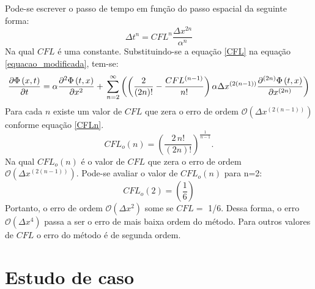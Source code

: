 \documentclass[10pt,twoside,a4paper]{article}
\begin{document}
Pode-se escrever o passo de tempo em função do passo espacial da seguinte forma:
\begin{equation} 
\Delta t^n= CFL^n \frac{\Delta x^{2n}}{\alpha^{n}}
\end{equation}
Na qual $CFL$ é uma constante. Substituindo-se a equação \ref{CFL} na equação \ref{equacao_modificada}, tem-se:
\begin{equation} \label{equacao_modificadaCFL}
\frac{\partial \Phi \left( x,t \right)}{\partial t} = \alpha \frac{\partial^{2} \Phi \left(t, x\right)}{\partial x^{2}}+ \\
\sum\limits_{n=2}^{\infty}\left( \left(\frac{ 2  }{\left(2n\right)!} -\frac{CFL^{\left(n-1\right)}  }{n!}\right) \alpha \Delta x^{\left(2\left(n-1\right)\right)} \frac{\partial^{\left(2n\right)} \Phi \left(t, x\right)}{\partial x^{\left(2n\right)}}\right)
\end{equation}
Para cada $n$ existe um valor de $CFL$ que zera o erro de ordem  $\mathcal{O}\left(\Delta x^{\left(2\left(n-1\right)\right)}\right)$ conforme equação \ref{CFLn}.
\begin{equation} \label{CFLn}
CFL_o\left(n\right)=\left(\frac{2 \, n!}{(2n)!}\right)^\frac{1}{n-1}.
\end{equation}
Na qual $CFL_o\left(n\right)$ é o valor de $CFL$ que zera o erro de ordem  $\mathcal{O}\left(\Delta x^{\left(2\left(n-1\right)\right)}\right)$. Pode-se avaliar o valor de $CFL_o\left(n\right)$ para n=2:
\begin{equation} \label{CFL_otimo}
CFL_o\left(2\right)=\left(\frac{1}{6}\right)
\end{equation}
Portanto, o erro de ordem $\mathcal{O}(\Delta x^2)$ some se $CFL=$ 1/6. Dessa forma, o erro $\mathcal{O}(\Delta x^4)$ passa a ser o erro de mais baixa ordem do método. Para outros valores de $CFL$ o erro do método é de segunda ordem.
\section{Estudo de caso} %
\end{document}

